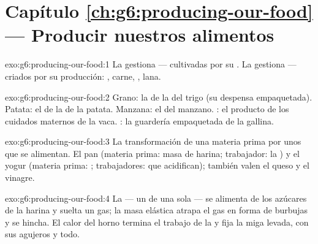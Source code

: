 \section*{Capítulo \ref{ch:g6:producing-our-food} --- Producir nuestros alimentos}

\begin{solution}{exo:g6:producing-our-food:1}
La  gestiona  ---  cultivadas por su
. La  gestiona  --- 
criados por su producción: , carne, , lana.
\end{solution}

\begin{solution}{exo:g6:producing-our-food:2}
Grano: la  de la  del trigo (su despensa empaquetada).
Patata: el  de la  de la patata. Manzana: el  del
manzano. : el producto de los cuidados maternos de la vaca. :
la guardería empaquetada de la gallina.
\end{solution}

\begin{solution}{exo:g6:producing-our-food:3}
La transformación de una materia prima por unos  que se
alimentan. El pan (materia prima: masa de harina; trabajador: la
) y el yogur (materia prima: ; trabajadores:  que
acidifican); también valen el queso y el vinagre.
\end{solution}

\begin{solution}{exo:g6:producing-our-food:4}
La  --- un  de una sola  --- se alimenta de los
azúcares de la harina y suelta un gas; la masa elástica atrapa el gas
en forma de burbujas y se hincha. El calor del horno termina el trabajo
de la  y fija la miga levada, con sus agujeros y todo.
\end{solution}


